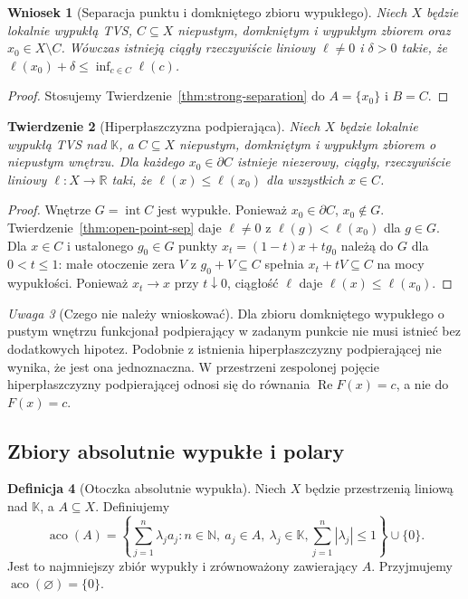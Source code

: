 \documentclass[11pt,a4paper]{article}
\numberwithin{equation}{section}
\theoremstyle{plain}
\newtheorem{twierdzenie}{Twierdzenie}[section]
\newtheorem{wniosek}[twierdzenie]{Wniosek}
\theoremstyle{definition}
\newtheorem{definicja}[twierdzenie]{Definicja}
\theoremstyle{remark}
\newtheorem{uwaga}[twierdzenie]{Uwaga}
\newcommand{\R}{\mathbb R}
\newcommand{\N}{\mathbb N}
\newcommand{\K}{\mathbb K}
\begin{document}
\begin{wniosek}[Separacja punktu i domkniętego zbioru wypukłego]
\label{cor:point-closed-convex}
Niech $X$ będzie lokalnie wypukłą TVS, $C\subseteq X$
niepustym, domkniętym i wypukłym zbiorem oraz
$x_0\in X\setminus C$. Wówczas istnieją
ciągły rzeczywiście liniowy $\ell\ne0$ i $\delta>0$
takie, że $\ell(x_0)+\delta\le\inf_{c\in C}\ell(c)$.
\end{wniosek}
\begin{proof}
Stosujemy Twierdzenie~\ref{thm:strong-separation}
do $A=\{x_0\}$ i $B=C$.
\end{proof}

\begin{twierdzenie}[Hiperpłaszczyzna podpierająca]
\label{thm:supporting-hyperplane}
Niech $X$ będzie lokalnie wypukłą TVS nad $\K$,
a $C\subseteq X$ niepustym, domkniętym i wypukłym
zbiorem o niepustym wnętrzu. Dla każdego $x_0\in\partial C$
istnieje niezerowy, ciągły, rzeczywiście liniowy
$\ell:X\to\R$ taki, że $\ell(x)\le\ell(x_0)$
dla wszystkich $x\in C$.
\end{twierdzenie}
\begin{proof}
Wnętrze $G=\operatorname{int} C$ jest wypukłe.
Ponieważ $x_0\in\partial C$, $x_0\notin G$.
Twierdzenie~\ref{thm:open-point-sep} daje $\ell\ne0$
z $\ell(g)<\ell(x_0)$ dla $g\in G$.
Dla $x\in C$ i ustalonego $g_0\in G$ punkty
$x_t=(1-t)x+tg_0$ należą do $G$ dla $0<t\le1$:
małe otoczenie zera $V$ z $g_0+V\subseteq C$
spełnia $x_t+tV\subseteq C$ na mocy wypukłości.
Ponieważ $x_t\to x$ przy $t\downarrow0$, ciągłość
$\ell$ daje $\ell(x)\le\ell(x_0)$.
\end{proof}

\begin{uwaga}[Czego nie należy wnioskować]
Dla zbioru domkniętego wypukłego o pustym wnętrzu
funkcjonał podpierający w zadanym punkcie nie musi
istnieć bez dodatkowych hipotez. Podobnie z istnienia
hiperpłaszczyzny podpierającej nie wynika, że jest ona
jednoznaczna. W przestrzeni zespolonej pojęcie
hiperpłaszczyzny podpierającej odnosi się do równania
$\operatorname{Re}F(x)=c$, a nie do $F(x)=c$.
\end{uwaga}

\subsection{Zbiory absolutnie wypukłe i polary}

\begin{definicja}[Otoczka absolutnie wypukła]
\label{def:absolutely-convex-hull}
Niech $X$ będzie przestrzenią liniową nad $\K$, a $A\subseteq X$.
Definiujemy
\[
\operatorname{aco}(A)=\left\{\sum_{j=1}^n\lambda_j a_j:
 n\in\N,\ a_j\in A,\ \lambda_j\in\K,
 \sum_{j=1}^n|\lambda_j|\le1\right\}\cup\{0\}.
\]
Jest to najmniejszy zbiór wypukły i zrównoważony zawierający $A$.
Przyjmujemy $\operatorname{aco}(\varnothing)=\{0\}$.
\end{definicja}
\end{document}
